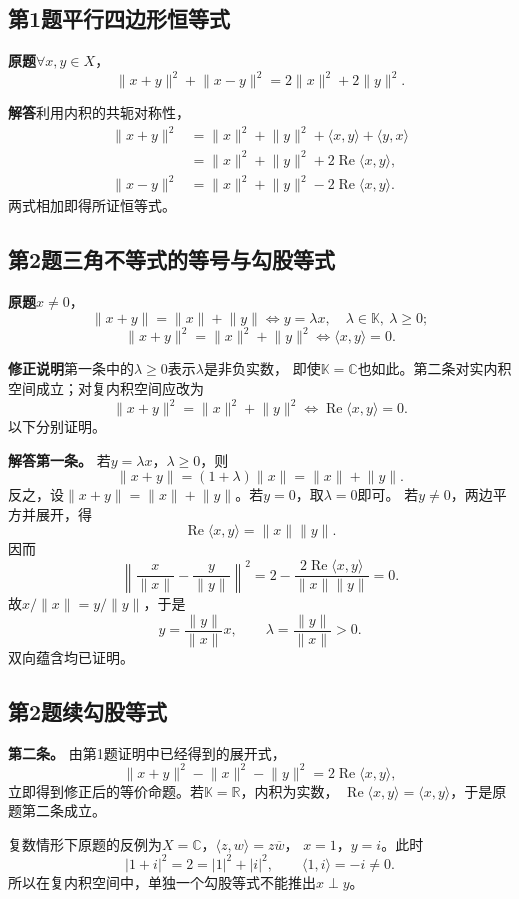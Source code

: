 \documentclass[11pt,a4paper]{ctexart}
\newcommand{\R}{\mathbb R}
\newcommand{\C}{\mathbb C}
\newcommand{\K}{\mathbb K}
\newcommand{\norm}[1]{\lVert#1\rVert}
\newcommand{\ip}[2]{\langle#1,#2\rangle}
\newcommand{\problem}{\par\textbf{原题}\quad}
\newcommand{\solution}{\par\medskip\textbf{解答}\quad}
\begin{document}
\subsection*{第1题\quad 平行四边形恒等式}
\problem $\forall x,y\in X$，
\[
 \norm{x+y}^2+\norm{x-y}^2
   =2\norm{x}^2+2\norm{y}^2.
\]

\solution 利用内积的共轭对称性，
\begin{align*}
 \norm{x+y}^2
 &=\norm{x}^2+\norm{y}^2+\ip{x}{y}+\ip{y}{x}\\
 &=\norm{x}^2+\norm{y}^2+2\operatorname{Re}\ip{x}{y},\\
 \norm{x-y}^2
 &=\norm{x}^2+\norm{y}^2-2\operatorname{Re}\ip{x}{y}.
\end{align*}
两式相加即得所证恒等式。

\subsection*{第2题\quad 三角不等式的等号与勾股等式}
\problem $x\ne0$，
\[
 \norm{x+y}=\norm{x}+\norm{y}
 \iff y=\lambda x,\quad\lambda\in\K,\ \lambda\ge0;
\]
\[
 \norm{x+y}^2=\norm{x}^2+\norm{y}^2
 \iff \ip{x}{y}=0.
\]

\textbf{修正说明}\quad 第一条中的$\lambda\ge0$表示$\lambda$是非负实数，
即使$\K=\C$也如此。第二条对实内积空间成立；对复内积空间应改为
\[
 \boxed{\norm{x+y}^2=\norm{x}^2+\norm{y}^2
       \iff\operatorname{Re}\ip{x}{y}=0.}
\]
以下分别证明。

\solution \textbf{第一条。}
若$y=\lambda x$，$\lambda\ge0$，则
\[
 \norm{x+y}=(1+\lambda)\norm{x}
 =\norm{x}+\norm{y}.
\]
反之，设$\norm{x+y}=\norm{x}+\norm{y}$。若$y=0$，取$\lambda=0$即可。
若$y\ne0$，两边平方并展开，得
\[
 \operatorname{Re}\ip{x}{y}=\norm{x}\norm{y}.
\]
因而
\[
 \left\|\frac{x}{\norm{x}}-\frac{y}{\norm{y}}\right\|^2
 =2-\frac{2\operatorname{Re}\ip{x}{y}}{\norm{x}\norm{y}}=0.
\]
故$x/\norm{x}=y/\norm{y}$，于是
\[
 y=\frac{\norm{y}}{\norm{x}}x,
 \qquad \lambda=\frac{\norm{y}}{\norm{x}}>0.
\]
双向蕴含均已证明。

\newpage
\subsection*{第2题续\quad 勾股等式}
\textbf{第二条。}
由第1题证明中已经得到的展开式，
\[
 \norm{x+y}^2-\norm{x}^2-\norm{y}^2
       =2\operatorname{Re}\ip{x}{y},
\]
立即得到修正后的等价命题。若$\K=\R$，内积为实数，
$\operatorname{Re}\ip{x}{y}=\ip{x}{y}$，于是原题第二条成立。

复数情形下原题的反例为$X=\C$，$\ip{z}{w}=z\overline w$，
$x=1$，$y=i$。此时
\[
 |1+i|^2=2=|1|^2+|i|^2,\qquad
 \ip{1}{i}=-i\ne0.
\]
所以在复内积空间中，单独一个勾股等式不能推出$x\perp y$。
\end{document}
